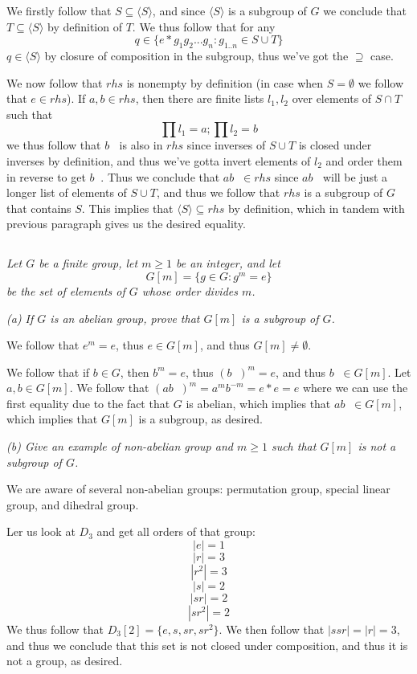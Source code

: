 \documentclass[11pt,oneside,titlepage]{book}
\DeclareMathOperator \inv {^{-1}}
\newcommand{\eangle}[1]{\langle #1 \rangle}
\newcommand{\set}[1]{\{ #1 \}}
\begin{document}
We firstly follow that $S \subseteq \eangle{S}$, and since
$\eangle{S}$ is a subgroup of $G$ we conclude that $T \subseteq
\eangle{S}$ by definition of $T$. We thus follow that for any
$$q \in \set{e * g_1 g_2 ... g_n: g_{1..n} \in S \cup T}$$
$q \in \eangle{S}$ by closure of composition in the subgroup, thus
we've got the $\supseteq$ case.

We now follow that $rhs$ is nonempty by definition (in case when $S =
\emptyset$ we follow that $e \in rhs$). If $a, b \in rhs$, then there
are finite lists $l_1, l_2$ over elements of $S \cap T$ such that
$$\prod{l_1} = a; \prod{l_2} = b$$
we thus follow that $b\inv$ is also in $rhs$ since inverses of $S \cup
T$ is closed under inverses by definition, and thus we've gotta invert
elements of $l_2$ and order them in reverse to get $b\inv$. Thus we
conclude that $a b\inv \in rhs$ since $a b\inv$ will be just a longer
list of elements of $S \cup T$, and thus we follow that $rhs$ is a
subgroup of $G$ that contains $S$. This implies that $\eangle{S}
\subseteq rhs$ by definition, which in tandem with previous paragraph
gives us the desired equality.

\subsection{}

\textit{Let $G$ be a finite group, let $m \geq 1$ be an integer, and
let
  $$G[m] = \set{g \in G: g^m = e}$$
  be the set of elements of $G$ whose order divides $m$. }

\textit{(a) If $G$ is an abelian group, prove that $G[m]$ is a
subgroup of $G$.}

We follow that $e^m = e$, thus $e \in G[m]$, and thus $G[m] \neq
\emptyset$.

We follow that if $b \in G$, then $b^m = e$, thus $(b\inv)^m = e$, and
thus $b\inv \in G[m]$.  Let $a, b \in G[m]$. We follow that $(a b\inv
)^m = a^m b^{-m} = e * e = e$ where we can use the first equality due
to the fact that $G$ is abelian, which implies that $ab\inv \in G[m]$,
which implies that $G[m]$ is a subgroup, as desired.

\textit{(b) Give an example of non-abelian group and $m \geq 1$ such
that $G[m]$ is not a subgroup of $G$.}

We are aware of several non-abelian groups: permutation group, special
linear group, and dihedral group.

Ler us look at $D_3$ and get all orders of that group:
$$|e| = 1$$
$$|r| = 3$$
$$|r^2| = 3$$
$$|s| = 2$$
$$|sr| = 2$$
$$|sr^2| = 2$$
We thus follow that $D_3[2] = \set{e, s, sr, sr^2}$. We then follow
that $|s sr| = |r| = 3$, and thus we conclude that this set is not
closed under composition, and thus it is not a group, as desired.
\end{document}
